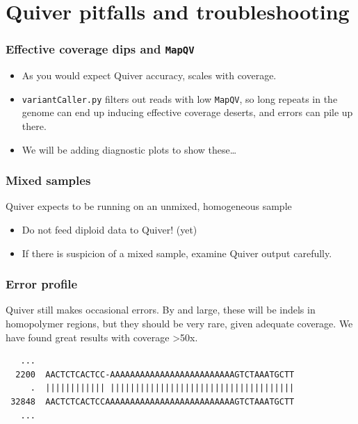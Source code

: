 \documentclass[11pt,serif]{beamer}
\begin{document}
\section{Quiver pitfalls and troubleshooting}
\label{sec-4}
\begin{frame}[fragile]\frametitle{Effective coverage dips and \verb~MapQV~}
\label{sec-4-1}

\begin{itemize}
\item As you would expect Quiver accuracy, scales with coverage.
\item \verb~variantCaller.py~ filters out reads with low \verb~MapQV~, so long
     repeats in the genome can end up inducing effective coverage
     deserts, and errors can pile up there.
\item We will be adding diagnostic plots to show these\ldots{}
\end{itemize}
\end{frame}
\begin{frame}[fragile]\frametitle{Mixed samples}
\label{sec-4-2}

Quiver expects to be running on an unmixed, homogeneous sample
\begin{itemize}
\item Do not feed diploid data to Quiver! (yet)
\item If there is suspicion of a mixed sample, examine Quiver output
    carefully.
\end{itemize}
\end{frame}
\begin{frame}[fragile]\frametitle{Error profile}
\label{sec-4-3}

Quiver still makes occasional errors.  By and large, these will be
indels in homopolymer regions, but they should be very rare, given
adequate coverage.  We have found great results with coverage >50x.

   \begin{scriptsize}
   \begin{verbatim}
   ...
  2200  AACTCTCACTCC-AAAAAAAAAAAAAAAAAAAAAAAAAGTCTAAATGCTT
     .  |||||||||||| |||||||||||||||||||||||||||||||||||||
 32848  AACTCTCACTCCAAAAAAAAAAAAAAAAAAAAAAAAAAGTCTAAATGCTT
   ...
   \end{verbatim}
   \end{scriptsize}
\end{frame}
\end{document}
